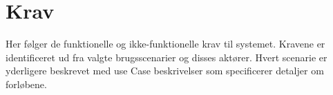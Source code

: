 \chapter{Krav}
Her følger de funktionelle og ikke-funktionelle krav til systemet. Kravene er identificeret ud fra valgte brugsscenarier og disses aktører. Hvert scenarie er yderligere beskrevet med use Case beskrivelser som specificerer detaljer om forløbene.






